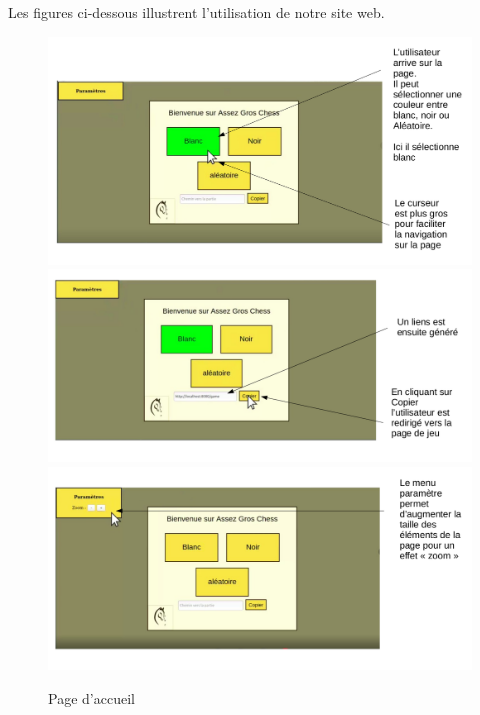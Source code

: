\documentclass[12pt, openany]{report}
\begin{document}
 Les figures ci-dessous illustrent l'utilisation de notre site web.
    \begin{center}
                \begin{figure}
                   \centering \includegraphics[width=12cm]{UseCase/Accueil1/Accueil1.png}
                   \includegraphics[width=12cm]{UseCase/Accueil1/Accueil2.png}
                    \includegraphics[width=12cm]{UseCase/Accueil1/Accueil3.png}
                    \caption{Page d'accueil}
                \end{figure}


\end{center}
\end{document}
